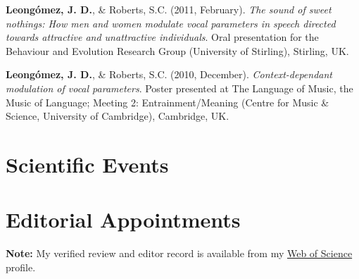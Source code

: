 \documentclass[11pt,a4paper,]{awesome-cv}
\begin{document}
\textbf{Leongómez, J. D.}, \& Roberts, S.C. (2011, February). \emph{The
sound of sweet nothings: How men and women modulate vocal parameters in
speech directed towards attractive and unattractive individuals}. Oral
presentation for the Behaviour and Evolution Research Group (University
of Stirling), Stirling, UK.

\textbf{Leongómez, J. D.}, \& Roberts, S.C. (2010, December).
\emph{Context-dependant modulation of vocal parameters}. Poster
presented at The Language of Music, the Music of Language; Meeting 2:
Entrainment/Meaning (Centre for Music \& Science, University of
Cambridge), Cambridge, UK.

\endgroup

\hypertarget{scientific-events}{%
\section{Scientific Events}\label{scientific-events}}

\begin{cventries}
\end{cventries}

\hypertarget{editorial-appointments}{%
\section{Editorial Appointments}\label{editorial-appointments}}

\begin{small}
\textbf{Note:} My verified review and editor record is available from my \href{https://www.webofscience.com/wos/author/record/387716}{Web of Science} profile. 
\end{small}
\end{document}

